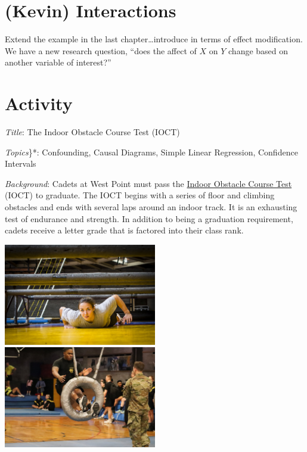 \documentclass[
]{book}
\begin{document}
\hypertarget{interactions}{%
\chapter{(Kevin) Interactions}\label{interactions}}

Extend the example in the last chapter\ldots introduce in terms of effect modification. We have a new research question, ``does the affect of \(X\) on \(Y\) change based on another variable of interest?''

\hypertarget{activity}{%
\chapter{Activity}\label{activity}}

\emph{Title}: The Indoor Obstacle Course Test (IOCT)

\emph{Topics}\}*: Confounding, Causal Diagrams, Simple Linear Regression, Confidence Intervals

\emph{Background}: Cadets at West Point must pass the \href{https://www.youtube.com/watch?v=94tPO0fGtJo\&t=77s}{Indoor Obstacle Course Test} (IOCT) to graduate. The IOCT begins with a series of floor and climbing obstacles and ends with several laps around an indoor track. It is an exhausting test of endurance and strength. In addition to being a graduation requirement, cadets receive a letter grade that is factored into their class rank.

\includegraphics[width=0.5\textwidth,height=\textheight]{./images/crawlObstacle.jpg} \includegraphics[width=0.5\textwidth,height=\textheight]{./images/tireObstacle.jpg}
\end{document}
